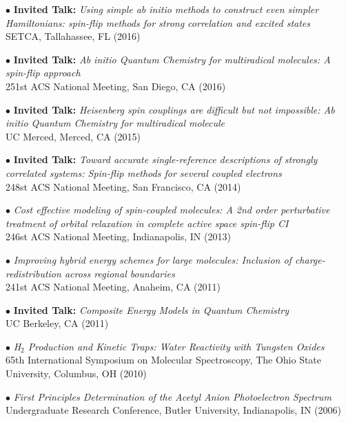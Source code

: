 \documentclass[10pt]{article}
\newenvironment{lonelist}[1][\enskip\textbullet]%
        {\vspace{-\baselineskip}\begin{list}{#1}{%
        \setlength{\partopsep}{0pt}%
        \setlength{\topsep}{0pt}}}
        {\end{list}\vspace{-.6\baselineskip}}
\begin{document}
\begin{lonelist}
\item[$\bullet$] \textbf{Invited Talk:} \textit{Using simple ab initio methods to construct even simpler Hamiltonians: spin-flip methods for strong correlation and excited states}\\
SETCA, Tallahassee, FL (2016)

\item[$\bullet$] \textbf{Invited Talk:} \textit{Ab initio Quantum Chemistry for multiradical molecules: A spin-flip approach}\\
251st ACS National Meeting, San Diego, CA (2016)

\item[$\bullet$] \textbf{Invited Talk:} \textit{Heisenberg spin couplings are difficult but not impossible: Ab initio Quantum Chemistry for multiradical molecule}\\
UC Merced, Merced, CA (2015)

\item[$\bullet$] \textbf{Invited Talk:} \textit{Toward accurate single-reference descriptions of strongly correlated systems: Spin-flip methods for several coupled electrons}\\
248st ACS National Meeting, San Francisco, CA (2014)

\item[$\bullet$] \textit{Cost effective modeling of spin-coupled molecules: A 2nd order perturbative treatment of orbital relaxation in complete active space spin-flip CI}\\
246st ACS National Meeting, Indianapolis, IN (2013)

\item[$\bullet$] \textit{Improving hybrid energy schemes for large molecules: Inclusion of charge-redistribution across regional boundaries}\\
241st ACS National Meeting, Anaheim, CA (2011)

\item[$\bullet$] \textbf{Invited Talk:} \textit{Composite Energy Models in Quantum Chemistry} \\
UC Berkeley, CA (2011)

\item[$\bullet$] \textit{H$_2$ Production and Kinetic Traps: Water Reactivity with Tungsten Oxides}\\
65th International Symposium on Molecular Spectroscopy, The Ohio State University, Columbus, OH (2010)

\item[$\bullet$] \textit{First Principles Determination of the Acetyl Anion Photoelectron Spectrum}\\
Undergraduate Research Conference, Butler University, Indianapolis, IN (2006)\\\\
\end{lonelist}
\end{document}
